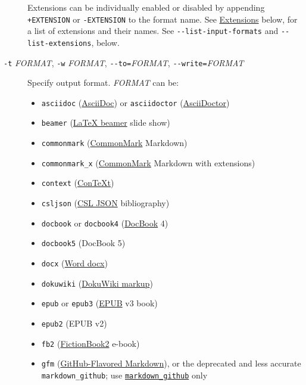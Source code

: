 \documentclass[]{article}
\providecommand{\tightlist}{%
  \setlength{\itemsep}{0pt}\setlength{\parskip}{0pt}}
\begin{document}
\begin{description}
Extensions can be individually enabled or disabled by appending
\texttt{+EXTENSION} or \texttt{-EXTENSION} to the format name. See
\protect\hyperlink{extensions}{Extensions} below, for a list of
extensions and their names. See \texttt{-\/-list-input-formats} and
\texttt{-\/-list-extensions}, below.
\item[\texttt{-t} \emph{FORMAT}, \texttt{-w} \emph{FORMAT},
\texttt{-\/-to=}\emph{FORMAT}, \texttt{-\/-write=}\emph{FORMAT}]
Specify output format. \emph{FORMAT} can be:

\hypertarget{output-formats}{}
\begin{itemize}
\tightlist
\item
  \texttt{asciidoc}
  (\href{https://www.methods.co.nz/asciidoc/}{AsciiDoc}) or
  \texttt{asciidoctor} (\href{https://asciidoctor.org/}{AsciiDoctor})
\item
  \texttt{beamer} (\href{https://ctan.org/pkg/beamer}{LaTeX beamer}
  slide show)
\item
  \texttt{commonmark} (\href{https://commonmark.org}{CommonMark}
  Markdown)
\item
  \texttt{commonmark\_x} (\href{https://commonmark.org}{CommonMark}
  Markdown with extensions)
\item
  \texttt{context} (\href{https://www.contextgarden.net/}{ConTeXt})
\item
  \texttt{csljson}
  (\href{https://citeproc-js.readthedocs.io/en/latest/csl-json/markup.html}{CSL
  JSON} bibliography)
\item
  \texttt{docbook} or \texttt{docbook4}
  (\href{https://docbook.org}{DocBook} 4)
\item
  \texttt{docbook5} (DocBook 5)
\item
  \texttt{docx}
  (\href{https://en.wikipedia.org/wiki/Office_Open_XML}{Word docx})
\item
  \texttt{dokuwiki} (\href{https://www.dokuwiki.org/dokuwiki}{DokuWiki
  markup})
\item
  \texttt{epub} or \texttt{epub3} (\href{http://idpf.org/epub}{EPUB} v3
  book)
\item
  \texttt{epub2} (EPUB v2)
\item
  \texttt{fb2}
  (\href{http://www.fictionbook.org/index.php/Eng:XML_Schema_Fictionbook_2.1}{FictionBook2}
  e-book)
\item
  \texttt{gfm}
  (\href{https://help.github.com/articles/github-flavored-markdown/}{GitHub-Flavored
  Markdown}), or the deprecated and less accurate
  \texttt{markdown\_github}; use
  \protect\hyperlink{markdown-variants}{\texttt{markdown\_github}} only

\end{itemize}
\end{description}
\end{document}

